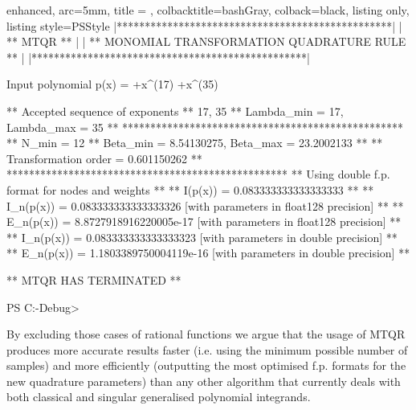 \documentclass[a4paper, twosided]{book}
\begin{document}
\vspace{0.2cm}
\begin{tcblisting}{enhanced,
                   arc=5mm,
                   title = \color{black}{\large \ttfamily Executing the driver test case: p\_3(x)},
                   colbacktitle=bashGray,
                   colback=black,
                   listing only,
                   listing style=PSStyle}
    |*************************************************|
    |                 ** MTQR **                      |
    |  ** MONOMIAL TRANSFORMATION QUADRATURE RULE **  |
    |*************************************************|
    
Input polynomial p(x) =  +x^(17)  +x^(35) 

 ** Accepted sequence of exponents ** 
    {17, 35}
 ** Lambda_min = 17, Lambda_max = 35 **
 **************************************************
 ** N_min = 12
 ** Beta_min = 8.54130275, Beta_max = 23.2002133 **
 ** Transformation order = 0.601150262 **
 **************************************************
 ** Using double f.p. format for nodes and weights **
 ** I(p(x))   = 0.083333333333333333 **
 ** I_n(p(x)) = 0.083333333333333326    [with parameters in float128 precision] **
 ** E_n(p(x)) = 8.8727918916220005e-17  [with parameters in float128 precision] **
 ** I_n(p(x)) = 0.083333333333333323    [with parameters in double precision] **
 ** E_n(p(x)) = 1.1803389750004119e-16  [with parameters in double precision] **

 ** MTQR HAS TERMINATED **

PS C:\MTQR\out\build{}-Debug>
\end{tcblisting}
\vspace{0.3cm}

\noindent
 By excluding those cases of rational functions we argue that the usage of MTQR produces more accurate results faster (i.e. using the minimum possible number of samples) and more efficiently (outputting the most optimised f.p. formats for the new quadrature parameters) than any other algorithm that currently deals with both classical and singular generalised polynomial integrands.
\end{document}
